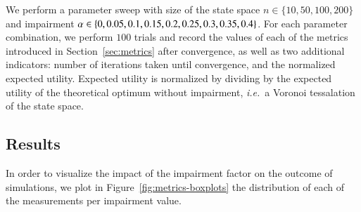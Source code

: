 We perform a parameter sweep with size of the state space $n \in \{10, 50, 100, 200\}$ and impairment $\alpha \in \{0, 0.05, 0.1, 0.15, 0.2, 0.25, 0.3, 0.35, 0.4\}$.
For each parameter combination, we perform $100$ trials and record the values of each of the metrics introduced in Section~\ref{sec:metrics} after convergence, as well as two additional indicators: number of iterations taken until convergence, and the normalized expected utility.
Expected utility is normalized by dividing by the expected utility of the theoretical optimum without impairment, \emph{i.e.}~a Voronoi tessalation of the state space. 

\subsection{Results}
In order to visualize the impact of the impairment factor on the outcome of simulations, we plot in Figure~\ref{fig:metrics-boxplots} the distribution of each of the measurements per impairment value.
%

